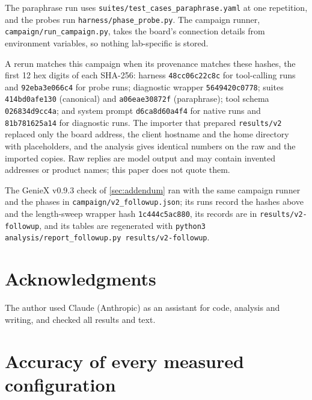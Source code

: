 \documentclass[11pt]{article}
\begin{document}
The paraphrase run uses \texttt{suites/test\_cases\_paraphrase.yaml} at one repetition, and the probes run \texttt{harness/phase\_probe.py}. The campaign runner, \texttt{campaign/run\_campaign.py}, takes the board's connection details from environment variables, so nothing lab-specific is stored.

A rerun matches this campaign when its provenance matches these hashes, the first 12 hex digits of each SHA-256: harness \texttt{48cc06c22c8c} for tool-calling runs and \texttt{92eba3e066c4} for probe runs; diagnostic wrapper \texttt{5649420c0778}; suites \texttt{414bd0afe130} (canonical) and \texttt{a06eae30872f} (paraphrase); tool schema \texttt{026834d9cc4a}; and system prompt \texttt{d6ca8d60a4f4} for native runs and \texttt{81b781625a14} for diagnostic runs. The importer that prepared \texttt{results/v2} replaced only the board address, the client hostname and the home directory with placeholders, and the analysis gives identical numbers on the raw and the imported copies. Raw replies are model output and may contain invented addresses or product names; this paper does not quote them.

The GenieX v0.9.3 check of \cref{sec:addendum} ran with the same campaign runner and the phases in \texttt{campaign/v2\_followup.json}; its runs record the hashes above and the length-sweep wrapper hash \texttt{1c444c5ac880}, its records are in \texttt{results/v2-followup}, and its tables are regenerated with \texttt{python3 analysis/report\_followup.py results/v2-followup}.

\section*{Acknowledgments}

The author used Claude (Anthropic) as an assistant for code, analysis and writing, and checked all results and text.




\appendix

\section{Accuracy of every measured configuration}\label{app:accuracy}
\end{document}
